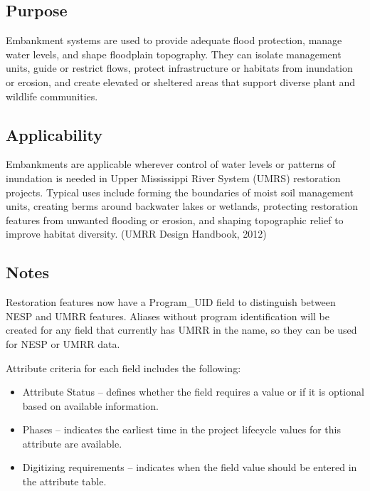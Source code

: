 \documentclass[
  letterpaper,
  DIV=11,
  numbers=noendperiod]{scrreprt}
\providecommand{\tightlist}{%
  \setlength{\itemsep}{0pt}\setlength{\parskip}{0pt}}
\begin{document}
\subsection{Purpose}\label{purpose-3}

Embankment systems are used to provide adequate flood protection, manage
water levels, and shape floodplain topography. They can isolate
management units, guide or restrict flows, protect infrastructure or
habitats from inundation or erosion, and create elevated or sheltered
areas that support diverse plant and wildlife communities.

\subsection{Applicability}\label{applicability-1}

Embankments are applicable wherever control of water levels or patterns
of inundation is needed in Upper Mississippi River System (UMRS)
restoration projects. Typical uses include forming the boundaries of
moist soil management units, creating berms around backwater lakes or
wetlands, protecting restoration features from unwanted flooding or
erosion, and shaping topographic relief to improve habitat diversity.
(UMRR Design Handbook, 2012)

\subsection{Notes}\label{notes-3}

Restoration features now have a Program\_UID field to distinguish
between NESP and UMRR features. Aliases without program identification
will be created for any field that currently has UMRR in the name, so
they can be used for NESP or UMRR data.

Attribute criteria for each field includes the following:

\begin{itemize}
\tightlist
\item
  Attribute Status -- defines whether the field requires a value or if
  it is optional based on available information.
\item
  Phases -- indicates the earliest time in the project lifecycle values
  for this attribute are available.
\item
  Digitizing requirements -- indicates when the field value should be
  entered in the attribute table.
\end{itemize}
\end{document}
